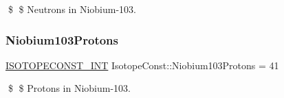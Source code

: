 \$ \$ Neutrons in Niobium-\/103. \mbox{\label{group___isotope_const-_niobium-_nb103_gac90dd265d326775b582aafc27c6721e5}} 
\subsubsection{\texorpdfstring{Niobium103\+Protons}{Niobium103Protons}}
{\footnotesize\ttfamily \mbox{\hyperlink{group___isotope_const-_macros_ga5f18360b3e99483a35c32d789e62621c}{I\+S\+O\+T\+O\+P\+E\+C\+O\+N\+S\+T\+\_\+\+I\+NT}} Isotope\+Const\+::\+Niobium103\+Protons = 41}

\$ \$ Protons in Niobium-\/103. 